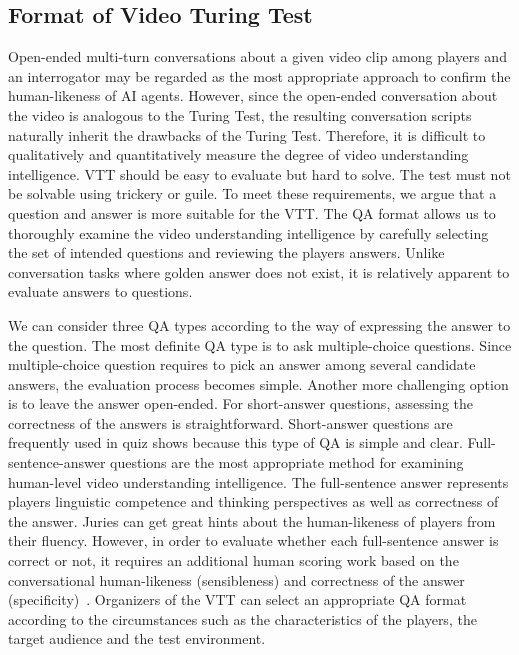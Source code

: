 \documentclass[letterpaper]{article} %
\begin{document}
\subsection{Format of Video Turing Test}
Open-ended multi-turn conversations about a given video clip among players and an interrogator may be regarded as the most appropriate approach to confirm the human-likeness of AI agents. However, since the open-ended conversation about the video is analogous to the Turing Test, the resulting conversation scripts naturally inherit the drawbacks of the Turing Test. Therefore, it is difficult to qualitatively and quantitatively measure the degree of video understanding intelligence.
VTT should be easy to evaluate but hard to solve. The test must not be solvable using trickery or guile. To meet these requirements, we argue that a question and answer is more suitable for the VTT. The QA format allows us to thoroughly examine the video understanding intelligence by carefully selecting the set of intended questions and reviewing the players answers. Unlike conversation tasks where golden answer does not exist, it is relatively apparent to evaluate answers to questions.

We can consider three QA types according to the way of expressing the answer to the question. The most definite QA type is to ask multiple-choice questions. Since multiple-choice question requires to pick an answer among several candidate answers, the evaluation process becomes simple.
Another more challenging option is to leave the answer open-ended. For short-answer questions, assessing the correctness of the answers is straightforward. Short-answer questions are frequently used in quiz shows because this type of QA is simple and clear. Full-sentence-answer questions are the most appropriate method for examining human-level video understanding intelligence. The full-sentence answer represents players linguistic competence and thinking perspectives as well as correctness of the answer. Juries can get great hints about the human-likeness of players from their fluency. However, in order to evaluate whether each full-sentence answer is correct or not, it requires an additional human scoring work based on the conversational human-likeness (sensibleness) and correctness of the answer (specificity)~\cite{adiwardana2020meena}.
Organizers of the VTT can select an appropriate QA format according to the circumstances such as the characteristics of the players, the target audience and the test environment.
\end{document}
